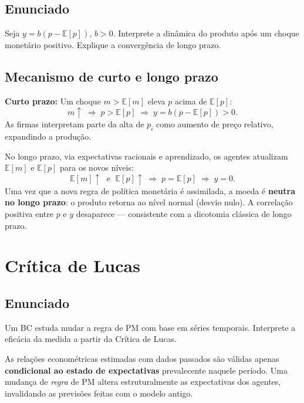 \documentclass[12pt, a4paper]{article}
\newcommand{\E}{\mathbb{E}}
\begin{document}
\subsection*{Enunciado}
Seja $y = b(p - \E[p])$, $b>0$. Interprete a dinâmica do produto após um choque
monetário positivo. Explique a convergência de longo prazo.

\subsection*{Mecanismo de curto e longo prazo}

\textbf{Curto prazo:} Um choque $m > \E[m]$ eleva $p$ acima de $\E[p]$:
\[
m \uparrow \;\Rightarrow\; p > \E[p] \;\Rightarrow\; y = b(p - \E[p]) > 0.
\]
As firmas interpretam parte da alta de $p_i$ como aumento de preço relativo,
expandindo a produção.

\begin{resultbox}[title={Convergência de longo prazo}]
No longo prazo, via expectativas racionais e aprendizado, os agentes atualizam
$\E[m]$ e $\E[p]$ para os novos níveis:
\[
\E[m] \uparrow \;\text{ e }\; \E[p] \uparrow \;\Rightarrow\; p = \E[p] \;\Rightarrow\; y = 0.
\]
Uma vez que a nova regra de política monetária é assimilada, a moeda é
\textbf{neutra no longo prazo}: o produto retorna ao nível normal (desvio nulo).
A correlação positiva entre $p$ e $y$ desaparece --- consistente com a
dicotomia clássica de longo prazo.
\end{resultbox}

\section{Crítica de Lucas}

\subsection*{Enunciado}
Um BC estuda mudar a regra de PM com base em séries temporais. Interprete a
eficácia da medida a partir da Crítica de Lucas.

\begin{resultbox}[title={Crítica de Lucas (1976)}]
As relações econométricas estimadas com dados passados são válidas apenas
\textbf{condicional ao estado de expectativas} prevalecente naquele período.
Uma mudança de \emph{regra} de PM altera estruturalmente as expectativas dos agentes,
invalidando as previsões feitas com o modelo antigo.
\end{resultbox}
\end{document}
